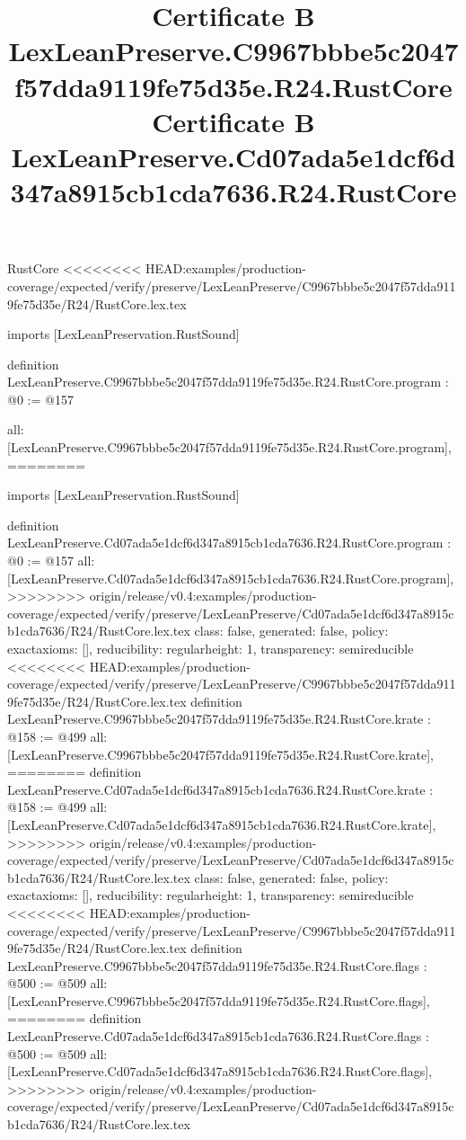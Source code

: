 \begin{lexlean}{RustCore}
<<<<<<<< HEAD:examples/production-coverage/expected/verify/preserve/LexLeanPreserve/C9967bbbe5c2047f57dda9119fe75d35e/R24/RustCore.lex.tex
\title{Certificate B LexLeanPreserve.C9967bbbe5c2047f57dda9119fe75d35e.R24.RustCore}
\begin{coremodule}
imports [LexLeanPreservation.RustSound]

definition LexLeanPreserve.C9967bbbe5c2047f57dda9119fe75d35e.R24.RustCore.program : @0 := @157 {
  all: [LexLeanPreserve.C9967bbbe5c2047f57dda9119fe75d35e.R24.RustCore.program],
========
\title{Certificate B LexLeanPreserve.Cd07ada5e1dcf6d347a8915cb1cda7636.R24.RustCore}
\begin{coremodule}
imports [LexLeanPreservation.RustSound]

definition LexLeanPreserve.Cd07ada5e1dcf6d347a8915cb1cda7636.R24.RustCore.program : @0 := @157 {
  all: [LexLeanPreserve.Cd07ada5e1dcf6d347a8915cb1cda7636.R24.RustCore.program],
>>>>>>>> origin/release/v0.4:examples/production-coverage/expected/verify/preserve/LexLeanPreserve/Cd07ada5e1dcf6d347a8915cb1cda7636/R24/RustCore.lex.tex
  class: false,
  generated: false,
  policy: exact{axioms: []},
  reducibility: regular{height: 1},
  transparency: semireducible
}
<<<<<<<< HEAD:examples/production-coverage/expected/verify/preserve/LexLeanPreserve/C9967bbbe5c2047f57dda9119fe75d35e/R24/RustCore.lex.tex
definition LexLeanPreserve.C9967bbbe5c2047f57dda9119fe75d35e.R24.RustCore.krate : @158 := @499 {
  all: [LexLeanPreserve.C9967bbbe5c2047f57dda9119fe75d35e.R24.RustCore.krate],
========
definition LexLeanPreserve.Cd07ada5e1dcf6d347a8915cb1cda7636.R24.RustCore.krate : @158 := @499 {
  all: [LexLeanPreserve.Cd07ada5e1dcf6d347a8915cb1cda7636.R24.RustCore.krate],
>>>>>>>> origin/release/v0.4:examples/production-coverage/expected/verify/preserve/LexLeanPreserve/Cd07ada5e1dcf6d347a8915cb1cda7636/R24/RustCore.lex.tex
  class: false,
  generated: false,
  policy: exact{axioms: []},
  reducibility: regular{height: 1},
  transparency: semireducible
}
<<<<<<<< HEAD:examples/production-coverage/expected/verify/preserve/LexLeanPreserve/C9967bbbe5c2047f57dda9119fe75d35e/R24/RustCore.lex.tex
definition LexLeanPreserve.C9967bbbe5c2047f57dda9119fe75d35e.R24.RustCore.flags : @500 := @509 {
  all: [LexLeanPreserve.C9967bbbe5c2047f57dda9119fe75d35e.R24.RustCore.flags],
========
definition LexLeanPreserve.Cd07ada5e1dcf6d347a8915cb1cda7636.R24.RustCore.flags : @500 := @509 {
  all: [LexLeanPreserve.Cd07ada5e1dcf6d347a8915cb1cda7636.R24.RustCore.flags],
>>>>>>>> origin/release/v0.4:examples/production-coverage/expected/verify/preserve/LexLeanPreserve/Cd07ada5e1dcf6d347a8915cb1cda7636/R24/RustCore.lex.tex
}}}
\end{coremodule}}
\end{coremodule}
\end{lexlean}
